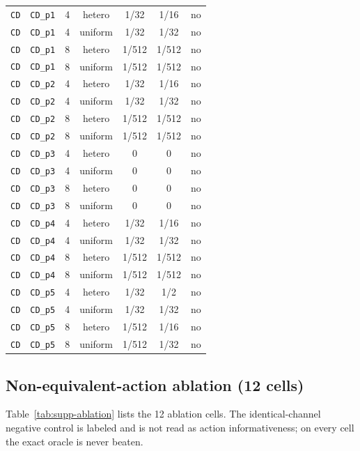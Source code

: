 \documentclass[11pt]{article}
\begin{document}
\begin{table}[ht]
\begin{tabular}{@{}lllcccc@{}}
\texttt{CD} & \texttt{CD\_p1} & 4 & hetero & 1/32 & 1/16 & no \\
\texttt{CD} & \texttt{CD\_p1} & 4 & uniform & 1/32 & 1/32 & no \\
\texttt{CD} & \texttt{CD\_p1} & 8 & hetero & 1/512 & 1/512 & no \\
\texttt{CD} & \texttt{CD\_p1} & 8 & uniform & 1/512 & 1/512 & no \\
\texttt{CD} & \texttt{CD\_p2} & 4 & hetero & 1/32 & 1/16 & no \\
\texttt{CD} & \texttt{CD\_p2} & 4 & uniform & 1/32 & 1/32 & no \\
\texttt{CD} & \texttt{CD\_p2} & 8 & hetero & 1/512 & 1/512 & no \\
\texttt{CD} & \texttt{CD\_p2} & 8 & uniform & 1/512 & 1/512 & no \\
\texttt{CD} & \texttt{CD\_p3} & 4 & hetero & 0 & 0 & no \\
\texttt{CD} & \texttt{CD\_p3} & 4 & uniform & 0 & 0 & no \\
\texttt{CD} & \texttt{CD\_p3} & 8 & hetero & 0 & 0 & no \\
\texttt{CD} & \texttt{CD\_p3} & 8 & uniform & 0 & 0 & no \\
\texttt{CD} & \texttt{CD\_p4} & 4 & hetero & 1/32 & 1/16 & no \\
\texttt{CD} & \texttt{CD\_p4} & 4 & uniform & 1/32 & 1/32 & no \\
\texttt{CD} & \texttt{CD\_p4} & 8 & hetero & 1/512 & 1/512 & no \\
\texttt{CD} & \texttt{CD\_p4} & 8 & uniform & 1/512 & 1/512 & no \\
\texttt{CD} & \texttt{CD\_p5} & 4 & hetero & 1/32 & 1/2 & no \\
\texttt{CD} & \texttt{CD\_p5} & 4 & uniform & 1/32 & 1/32 & no \\
\texttt{CD} & \texttt{CD\_p5} & 8 & hetero & 1/512 & 1/16 & no \\
\texttt{CD} & \texttt{CD\_p5} & 8 & uniform & 1/512 & 1/32 & no \\
\bottomrule
\end{tabular}
\end{table}

\subsection{Non-equivalent-action ablation (12 cells)}\label{sec:supp-ablation}
Table~\ref{tab:supp-ablation} lists the 12 ablation cells. The identical-channel negative control is
labeled \texttt{} and is not read as action informativeness;
on every cell the exact oracle is never beaten.
\end{document}
